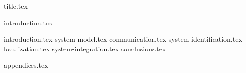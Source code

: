 \documentclass[final]{scrreprt} %
\begin{document}

{title.tex}

\newpage
{introduction.tex}
\newpage
\tableofcontents

\newpage
{}
{introduction.tex}
{system-model.tex}
{communication.tex}
{system-identification.tex}
{localization.tex}
{system-integration.tex}
{conclusions.tex}
\newpage
{}

\printbibliography
{appendices.tex}
\end{document}
